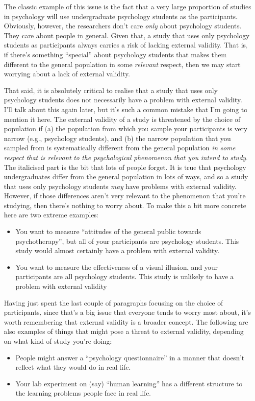The classic example of this issue is the fact that a very large proportion of studies in psychology will use undergraduate psychology students as the participants. Obviously, however, the researchers don't care {\it only} about psychology students. They care about people in general. Given that, a study that uses only psychology students as participants always carries a risk of lacking external validity. That is, if there's something ``special'' about psychology students that makes them different to the general population in some {\it relevant} respect, then we may start worrying about a lack of external validity.

That said, it is absolutely critical to realise that a study that uses only psychology students does not necessarily have a problem with external validity. I'll talk about this again later, but it's such a common mistake that I'm going to mention it here. The external validity of a study is threatened by the choice of population if (a) the population from which you sample  your participants is very narrow (e.g., psychology students), and (b) the narrow population that you sampled from is systematically different from the general population {\it in some respect that is relevant to the psychological phenomenon that you intend to study}. The italicised part is the bit that lots of people forget. It is true that psychology undergraduates differ from the general population in lots of ways, and so a study that uses only psychology students {\it may} have problems with external validity. However, if those differences aren't very relevant to the phenomenon that you're studying, then there's nothing to worry about. To make this a bit more concrete here are two extreme examples:
\begin{itemize}
\item You want to measure ``attitudes of the general public towards psychotherapy'', but all of your participants are psychology students. This study would almost certainly have a problem with external validity.
\item You want to measure the effectiveness of a visual illusion, and your participants are all psychology students. This study is unlikely to have a problem with external validity
\end{itemize}

Having just spent the last couple of paragraphs focusing on the choice of participants, since that's a big issue that everyone tends to worry most about, it's worth remembering that external validity is a broader concept. The following are also examples of things that might pose a threat to external validity, depending on what kind of study you're doing:
\begin{itemize}
\item People might answer a ``psychology questionnaire'' in a manner that doesn't reflect what they would do in real life.
\item Your lab experiment on (say) ``human learning'' has a different structure to the learning problems people face in real life.
\end{itemize}


